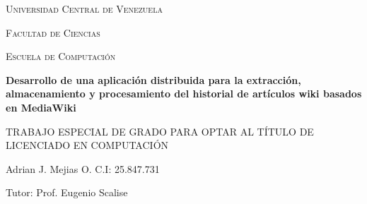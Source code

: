 \begin{titlepage}
	\centering
	{\scshape\LARGE Universidad Central de Venezuela\par}
	{\scshape\LARGE Facultad de Ciencias\par}
	{\scshape\LARGE Escuela de Computación\par}

	\vspace*{\fill}
	{\huge\bfseries Desarrollo de una aplicación distribuida para la extracción, almacenamiento y procesamiento del historial de artículos wiki basados en MediaWiki\par}
	\vspace{2cm}
	{\large TRABAJO ESPECIAL DE GRADO PARA OPTAR AL TÍTULO DE LICENCIADO EN COMPUTACIÓN\par}
	\vspace*{\fill}

	{\large Adrian J. Mejias O. C.I: 25.847.731\par}
	{\large Tutor: Prof. Eugenio Scalise\par}
	\vspace{1cm}
\end{titlepage}